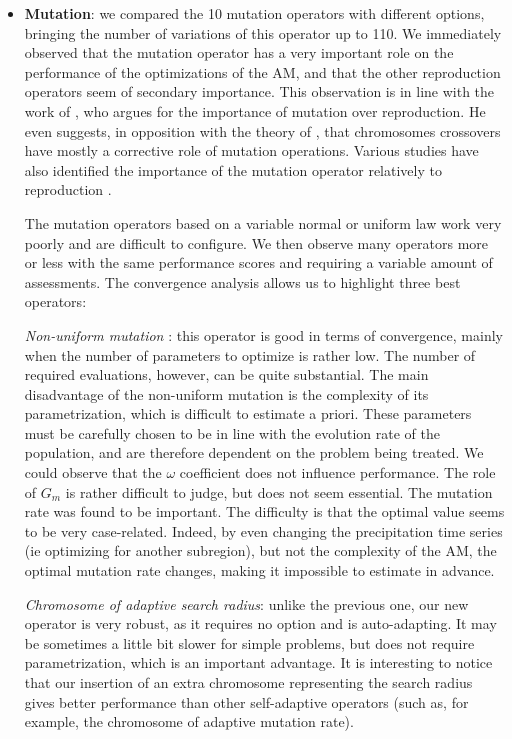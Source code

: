 \documentclass[twocol]{ametsoc}
\begin{document}
\begin{itemize}
	\item \textbf{Mutation}: we compared the 10 mutation operators with different options, bringing the number of variations of this operator up to 110. We immediately observed that the mutation operator has a very important role on the performance of the optimizations of the AM, and that the other reproduction operators seem of secondary importance. This observation is in line with the work of \citet{Back1996a}, who argues for the importance of mutation over reproduction. He even suggests, in opposition with the theory of \citet{Holland1992a}, that chromosomes crossovers have mostly a corrective role of mutation operations. Various studies have also identified the importance of the mutation operator relatively to reproduction \citep[see eg.][]{Back1992a, Back1996b, Smith1997a, Deb1999, Haupt2004, Costa2005a, Costa2007a}.
	
	The mutation operators based on a variable normal or uniform law work very poorly and are difficult to configure. We then observe many operators more or less with the same performance scores and requiring a variable amount of assessments. The convergence analysis allows us to highlight three best operators:
	
	\textit{Non-uniform mutation} \citep{Michalewicz1996}: this operator is good in terms of convergence, mainly when the number of parameters to optimize is rather low. The number of required evaluations, however, can be quite substantial. The main disadvantage of the non-uniform mutation is the complexity of its parametrization, which is difficult to estimate a priori. These parameters must be carefully chosen to be in line with the evolution rate of the population, and are therefore dependent on the problem being treated. We could observe that the $\omega$ coefficient does not influence performance. The role of $G_{m}$ is rather difficult to judge, but does not seem essential. The mutation rate was found to be important. The difficulty is that the optimal value seems to be very case-related. Indeed, by even changing the precipitation time series (ie optimizing for another subregion), but not the complexity of the AM, the optimal mutation rate changes, making it impossible to estimate in advance.
	
	\textit{Chromosome of adaptive search radius}: unlike the previous one, our new operator is very robust, as it requires no option and is auto-adapting. It may be sometimes a little bit slower for simple problems, but does not require parametrization, which is an important advantage. It is interesting to notice that our insertion of an extra chromosome representing the search radius gives better performance than other self-adaptive operators (such as, for example, the chromosome of adaptive mutation rate).
	

\end{itemize}
\end{document}
